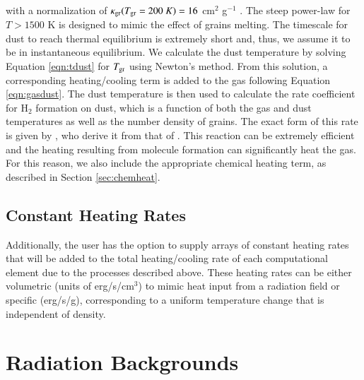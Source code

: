 with a normalization of $\kappa_{\rm gr}(T_{\rm gr} = 200~K) = 16$ cm$^{2}$ g$^{-1}$
\citep{1994ApJ...421..615P, 2000ApJ...534..809O}.  The steep power-law
for $T > 1500$ K is designed to mimic the effect of grains melting.
The timescale for dust to reach thermal equilibrium is extremely
short and, thus, we assume it to be in instantaneous equilibrium.  We
calculate the dust temperature by solving Equation \ref{eqn:tdust} for
$T_{\rm gr}$ using Newton's method.  From this solution, a corresponding
heating/cooling term is added to the gas following Equation
\ref{eqn:gasdust}.  The dust temperature is then used to calculate the
rate coefficient for H$_{2}$ formation on dust, which is a function of
both the gas and dust temperatures as well as the number density of
grains.  The exact form of this rate is given by
\citet{2000ApJ...534..809O}, who derive it from that of
\citet{1985ApJ...291..722T}.  This reaction can be extremely
efficient and the heating resulting from molecule formation can
significantly heat the gas.  For this reason, we also include the
appropriate chemical heating term, as described in Section
\ref{sec:chemheat}.

\subsection{Constant Heating Rates}
\label{section:constant-heating}

Additionally, the user has the option to supply arrays of constant
heating rates that will be added to the total heating/cooling rate
of each computational element due to the processes described above.
These heating rates can be either volumetric (units of
erg/s/cm$^{3}$) to mimic heat input from a radiation field or
specific (erg/s/g), corresponding to a uniform temperature change that
is independent of density.




\section{Radiation Backgrounds}
\label{section:radback}

